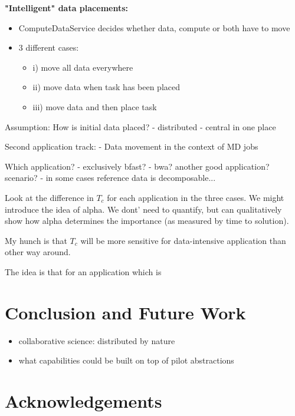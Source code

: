 \documentclass{sig-alternate}
\begin{document}
\textbf{"Intelligent" data placements:}
\begin{itemize}
	\item ComputeDataService decides whether data, compute or both have to move
	\item 3 different cases:
\begin{itemize}
	\item 	i) move all data everywhere
	\item 	ii) move data when task has been placed
	\item     iii) move data and then place task
\end{itemize}
\end{itemize}


Assumption:
How is initial data placed?
- distributed
- central in one place

Second application track:
- Data movement in the context of MD jobs

Which application?
- exclusively bfast?
- bwa? another good application? scenario?
- in some cases reference data is decomposable...

Look at the difference in $T_c$ for each application in the three
cases. We might introduce the idea of alpha. We dont' need to
quantify, but can qualitatively show how alpha determines the
importance (as measured by time to solution). 

My hunch is that $T_c$ will be more sensitive for data-intensive
application than other way around.

The idea is that for an application which is



\section{Conclusion and Future Work}

\begin{itemize}
\item collaborative science: distributed by nature
\item what capabilities could be built on top of pilot abstractions
\end{itemize}


\section*{Acknowledgements}
\end{document}
